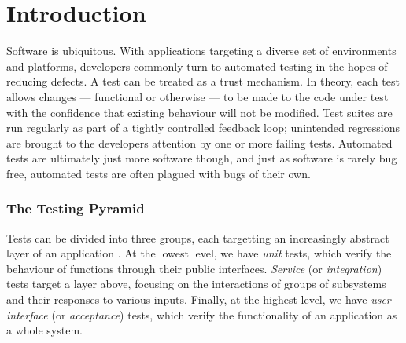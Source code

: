 \section{Introduction}
\label{sec:intro}


Software is ubiquitous. With applications targeting a diverse set of environments and platforms, developers commonly turn to automated testing in the hopes of reducing defects. A test can be treated as a trust mechanism. In theory, each test allows changes --- functional or otherwise --- to be made to the code under test with the confidence that existing behaviour will not be modified. Test suites are run regularly as part of a tightly controlled feedback loop; unintended regressions are brought to the developers attention by one or more failing tests. Automated tests are ultimately just more software though, and just as software is rarely bug free, automated tests are often plagued with bugs of their own.

\subsubsection{The Testing Pyramid}
\label{sec:sec:sec:the_testing_pyramid}

Tests can be divided into three groups, each targetting an increasingly abstract layer of an application \citep[see][Chapter~16]{cohn2009succeeding}. At the lowest level, we have \emph{unit} tests, which verify the behaviour of functions through their public interfaces. \emph{Service} (or \emph{integration}) tests target a layer above, focusing on the interactions of groups of subsystems and their responses to various inputs. Finally, at the highest level, we have \emph{user interface} (or \emph{acceptance}) tests, which verify the functionality of an application as a whole system.

